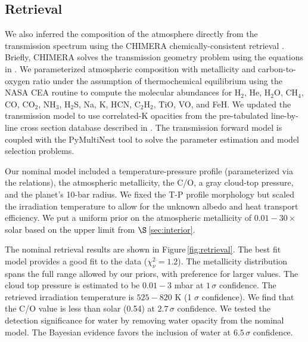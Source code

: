 \documentclass[twocolumn, trackchanges]{aastex61}
\begin{document}
\subsection{Retrieval}
\label{sec:retrieval}
We also inferred the composition of the atmosphere directly from the transmission spectrum using the CHIMERA chemically-consistent retrieval \citep{line13a}.   Briefly, CHIMERA solves the transmission geometry problem using the equations in \cite{brown01, tinetti12}.  We parameterized atmospheric composition with metallicity and carbon-to-oxygen ratio under the assumption of thermochemical equilibrium using the NASA CEA routine \citep{gordon94} to compute the molecular abundances for H$_2$, He, H$_2$O, CH$_4$, CO, CO$_2$, NH$_3$, H$_2$S, Na, K, HCN, C$_2$H$_2$, TiO, VO, and FeH.    We updated the transmission model to use correlated-K opacities \citep{lacis91, molliere15, amundsen16} from the pre-tabulated line-by-line cross section database described in \cite{freedman14}. The transmission forward model is coupled with the PyMultiNest tool \citep{buchner16} to solve the parameter estimation and model selection problems.  

Our nominal model included a temperature-pressure profile (parameterized via the \citealt{guillot10} relations), the atmospheric metallicity, the C/O, a gray cloud-top pressure, and the planet's 10-bar radius.  We fixed the T-P profile morphology but scaled the irradiation temperature to allow for the unknown albedo and heat transport efficiency.  We put a uniform prior on the atmospheric metallicity of $0.01 - 30\times$ solar based on the upper limit from $\S$\,\ref{sec:interior}.  


The nominal retrieval results are shown in Figure\,\ref{fig:retrieval}.  The best fit model provides a good fit to the data ($\chi^2_\nu = 1.2$).  The metallicity distribution spans the full range allowed by our priors, with preference for larger values. The cloud top pressure is estimated to be $0.01 - 3$ mbar at $1\,\sigma$ confidence. The retrieved irradiation temperature is $525 - 820$ K (1 $\sigma$ confidence).  We find that the C/O value is less than solar (0.54) at $2.7\,\sigma$ confidence.  We tested the detection significance for water by removing water opacity from the nominal model. The Bayesian evidence favors the inclusion of water at $6.5\,\sigma$ confidence. 
\end{document}

